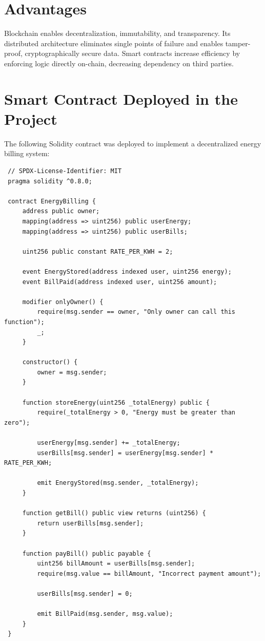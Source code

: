 \documentclass[a4paper,12pt]{report}
\begin{document}
 \section{Advantages}
 Blockchain enables decentralization, immutability, and transparency.  Its distributed architecture eliminates single points of failure and enables tamper-proof, cryptographically secure data.  Smart contracts increase efficiency by enforcing logic directly on-chain, decreasing dependency on third parties.
 
 \section{Smart Contract Deployed in the Project}
 The following Solidity contract was deployed to implement a decentralized energy billing system:
 
 \begin{lstlisting}
 // SPDX-License-Identifier: MIT
 pragma solidity ^0.8.0;
 
 contract EnergyBilling {
     address public owner;
     mapping(address => uint256) public userEnergy;
     mapping(address => uint256) public userBills;
 
     uint256 public constant RATE_PER_KWH = 2;
 
     event EnergyStored(address indexed user, uint256 energy);
     event BillPaid(address indexed user, uint256 amount);
 
     modifier onlyOwner() {
         require(msg.sender == owner, "Only owner can call this function");
         _;
     }
 
     constructor() {
         owner = msg.sender;
     }
 
     function storeEnergy(uint256 _totalEnergy) public {
         require(_totalEnergy > 0, "Energy must be greater than zero");
 
         userEnergy[msg.sender] += _totalEnergy;
         userBills[msg.sender] = userEnergy[msg.sender] * RATE_PER_KWH;
 
         emit EnergyStored(msg.sender, _totalEnergy);
     }
 
     function getBill() public view returns (uint256) {
         return userBills[msg.sender];
     }
 
     function payBill() public payable {
         uint256 billAmount = userBills[msg.sender];
         require(msg.value == billAmount, "Incorrect payment amount");
 
         userBills[msg.sender] = 0;
 
         emit BillPaid(msg.sender, msg.value);
     }
 }
 \end{lstlisting}
 
\end{document}
